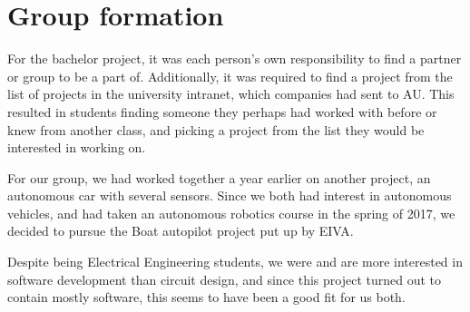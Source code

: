\chapter{Group formation}
For the bachelor project, it was each person's own responsibility to find a partner or group to be a part of. Additionally, it was required to find a project from the list of projects in the university intranet, which companies had sent to AU. This resulted in students finding someone they perhaps had worked with before or knew from another class, and picking a project from the list they would be interested in working on. 

For our group, we had worked together a year earlier on another project, an autonomous car with several sensors. Since we both had interest in autonomous vehicles, and had taken an autonomous robotics course in the spring of 2017, we decided to pursue the Boat autopilot project put up by EIVA. 

Despite being Electrical Engineering students, we were and are more interested in software development than circuit design, and since this project turned out to contain mostly software, this seems to have been a good fit for us both.